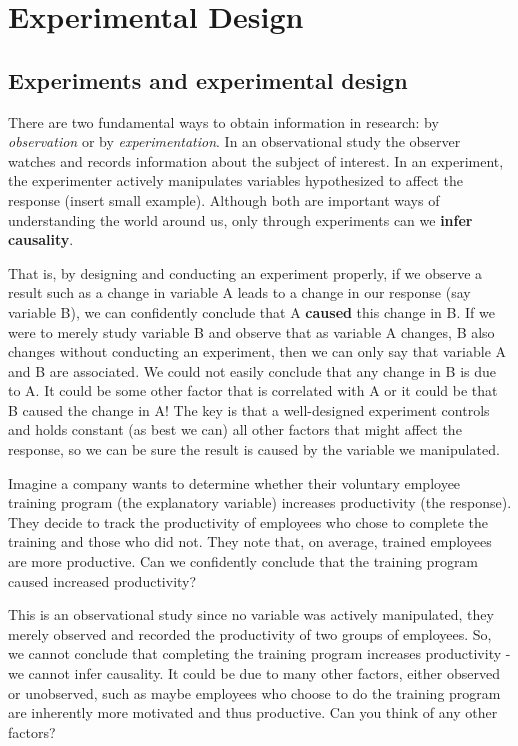\documentclass[
  letterpaper,
]{book}
\begin{document}
\part{Experimental Design}

\chapter{Experiments and experimental
design}\label{experiments-and-experimental-design}

There are two fundamental ways to obtain information in research: by
\emph{observation} or by \emph{experimentation}. In an observational
study the observer watches and records information about the subject of
interest. In an experiment, the experimenter actively manipulates
variables hypothesized to affect the response (insert small example).
Although both are important ways of understanding the world around us,
only through experiments can we \textbf{infer causality}.

That is, by designing and conducting an experiment properly, if we
observe a result such as a change in variable A leads to a change in our
response (say variable B), we can confidently conclude that A
\textbf{caused} this change in B. If we were to merely study variable B
and observe that as variable A changes, B also changes without
conducting an experiment, then we can only say that variable A and B are
associated. We could not easily conclude that any change in B is due to
A. It could be some other factor that is correlated with A or it could
be that B caused the change in A! The key is that a well-designed
experiment controls and holds constant (as best we can) all other
factors that might affect the response, so we can be sure the result is
caused by the variable we manipulated.

Imagine a company wants to determine whether their voluntary employee
training program (the explanatory variable) increases productivity (the
response). They decide to track the productivity of employees who chose
to complete the training and those who did not. They note that, on
average, trained employees are more productive. Can we confidently
conclude that the training program caused increased productivity?

This is an observational study since no variable was actively
manipulated, they merely observed and recorded the productivity of two
groups of employees. So, we cannot conclude that completing the training
program increases productivity - we cannot infer causality. It could be
due to many other factors, either observed or unobserved, such as maybe
employees who choose to do the training program are inherently more
motivated and thus productive. Can you think of any other factors?
\end{document}
